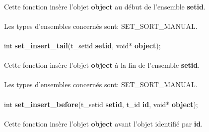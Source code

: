 \documentclass[10pt,a4wide]{article}
\begin{document}
\paragraph{}

Cette fonction ins\`ere l'objet \textbf{object} au d\'ebut de l'ensemble
\textbf{setid}.

\paragraph{}

Les types d'ensembles concern\'es sont: SET\_SORT\_MANUAL.

\paragraph{}

\hspace{1.5cm}int \textbf{set\_insert\_tail}(t\_setid \textbf{setid},
                                             void* \textbf{object});

\paragraph{}

Cette fonction ins\`ere l'objet \textbf{object} \`a la fin de l'ensemble
\textbf{setid}.

\paragraph{}

Les types d'ensembles concern\'es sont: SET\_SORT\_MANUAL.

\paragraph{}

\hspace{1.5cm}int \textbf{set\_insert\_before}(t\_setid \textbf{setid},
                                               t\_id \textbf{id},
                                               void* \textbf{object});

\paragraph{}

Cette fonction ins\`ere l'objet \textbf{object} avant l'objet identifi\'e
par \textbf{id}.
\end{document}
